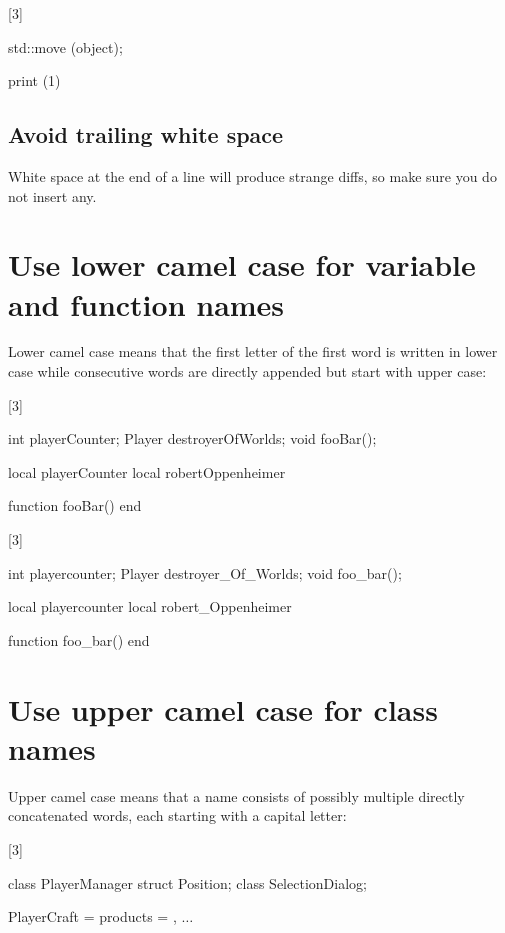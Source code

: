 \documentclass[a4paper,11pt]{scrreprt}
\newcommand{\marginMarker}[1]{%
\marginnote{%
    \hfill%
		\Huge{#1}%
}[3\baselineskip]%
}
\newcommand{\conforming}{%
\marginMarker{\textcolor{green}{\ding{51}}}%
}
\newcommand{\nonconforming}{%
\marginMarker{\textcolor{red}{\ding{55}}}%
}
\begin{document}
\nonconforming{}
\begin{cppBox}[showspaces]
std::move (object);
\end{cppBox}
\begin{luaBox}[showspaces]
print (1)
\end{luaBox}

\subsection{Avoid trailing white space}
White space at the end of a line will produce strange diffs, so make sure you do not insert any.

\section{Use lower camel case for variable and function names}
Lower camel case means that the first letter of the first word is written in lower case while consecutive words are directly appended but start with upper case:

\conforming{}
\begin{cppBox}
int playerCounter;
Player destroyerOfWorlds;
void fooBar();
\end{cppBox}
\begin{luaBox}
local playerCounter
local robertOppenheimer

function fooBar()
end
\end{luaBox}

\nonconforming{}
\begin{cppBox}
int playercounter;
Player destroyer_Of_Worlds;
void foo_bar();
\end{cppBox}
\begin{luaBox}
local playercounter
local robert_Oppenheimer

function foo_bar()
end
\end{luaBox}


\section{Use upper camel case for class names}
Upper camel case means that a name consists of possibly multiple directly concatenated words, each starting with a capital letter:

\conforming{}
\begin{cppBox}
class PlayerManager
struct Position;
class SelectionDialog;
\end{cppBox}
\begin{luaBox}[mathescape]
PlayerCraft = {
    products = {},
    $\dots$
}
\end{luaBox}
\end{document}
